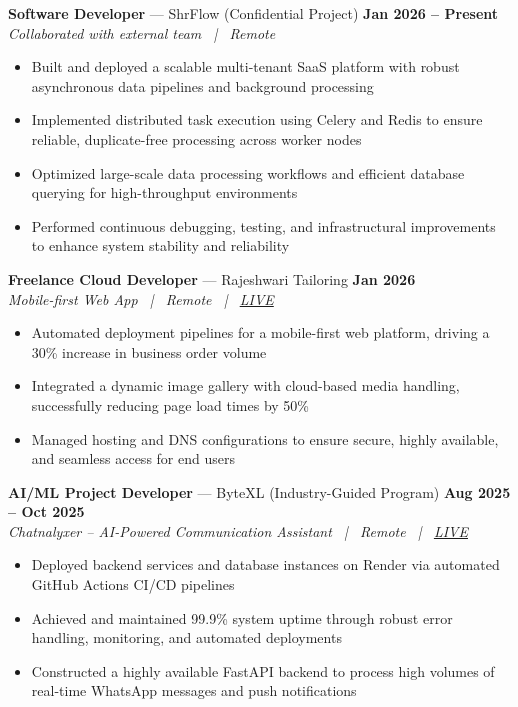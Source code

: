 \documentclass[10pt,a4paper]{article}
\begin{document}
\noindent\textbf{Software Developer} --- ShrFlow (Confidential Project) \hfill \textbf{Jan 2026 -- Present} \\
\textit{Collaborated with external team \ | \ Remote}
\begin{itemize}[leftmargin=1.2em, topsep=0pt, itemsep=0pt, parsep=0pt]
    \item Built and deployed a scalable multi-tenant SaaS platform with robust asynchronous data pipelines and background processing
    \item Implemented distributed task execution using Celery and Redis to ensure reliable, duplicate-free processing across worker nodes
    \item Optimized large-scale data processing workflows and efficient database querying for high-throughput environments
    \item Performed continuous debugging, testing, and infrastructural improvements to enhance system stability and reliability
\end{itemize}

\vspace{1pt}

\noindent\textbf{Freelance Cloud Developer} --- Rajeshwari Tailoring \hfill \textbf{Jan 2026} \\
\textit{Mobile-first Web App \ | \ Remote \ | \ \href{https://tailoring-red.vercel.app}{LIVE}}
\begin{itemize}[leftmargin=1.2em, topsep=0pt, itemsep=0pt, parsep=0pt]
    \item Automated deployment pipelines for a mobile-first web platform, driving a 30\% increase in business order volume
    \item Integrated a dynamic image gallery with cloud-based media handling, successfully reducing page load times by 50\%
    \item Managed hosting and DNS configurations to ensure secure, highly available, and seamless access for end users
\end{itemize}

\vspace{1pt}

\noindent\textbf{AI/ML Project Developer} --- ByteXL (Industry-Guided Program) \hfill \textbf{Aug 2025 -- Oct 2025} \\
\textit{Chatnalyxer -- AI-Powered Communication Assistant \ | \ Remote \ | \ \href{http://chatnalyxer.app/}{LIVE}}
\begin{itemize}[leftmargin=1.2em, topsep=0pt, itemsep=0pt, parsep=0pt]
    \item Deployed backend services and database instances on Render via automated GitHub Actions CI/CD pipelines
    \item Achieved and maintained 99.9\% system uptime through robust error handling, monitoring, and automated deployments
    \item Constructed a highly available FastAPI backend to process high volumes of real-time WhatsApp messages and push notifications
\end{itemize}
\end{document}
